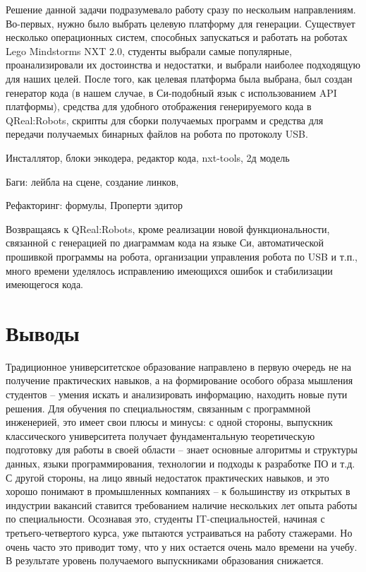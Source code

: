 \documentclass[a5paper]{article}
\begin{document}
Решение данной задачи подразумевало работу сразу по нескольим направлениям. Во-первых, нужно было выбрать целевую платформу для генерации. Существует несколько операционных систем, способных запускаться и работать на роботах Lego Mindstorms NXT 2.0, студенты выбрали самые популярные, проанализировали их достоинства и недостатки, и выбрали наиболее подходящую для наших целей.
После того, как целевая платформа была выбрана, был создан генератор кода (в нашем случае, в Си-подобный язык с использованием API платформы), средства для удобного отображения генерируемого кода в QReal:Robots, скрипты для сборки получаемых программ и средства для передачи получаемых бинарных файлов на робота по протоколу USB.


Инсталлятор, блоки энкодера, редактор кода, nxt-tools, 2д модель

Баги: лейбла на сцене, создание линков,

Рефакторинг: формулы, Проперти эдитор


Возвращаясь к QReal:Robots, кроме реализации новой функциональности, связанной с генерацией по диаграммам кода на языке Си, автоматической прошивкой программы на робота, организации управления робота по USB и т.п., много времени уделялось исправлению имеющихся ошибок и стабилизации имеющегося кода. 

\section{Выводы} 

Традиционное университетское образование направлено в первую очередь не на получение практических навыков, а на формирование особого образа мышления студентов -- умения искать и анализировать информацию, находить новые пути решения. Для обучения по специальностям, связанным с программной инженерией, это имеет свои плюсы и минусы: с одной стороны, выпускник классического университета получает фундаментальную теоретическую подготовку для работы в своей области -- знает основные алгоритмы и структуры данных, языки программирования, технологии и подходы к разработке ПО и т.д. С другой стороны, на лицо явный недостаток практических навыков, и это хорошо понимают в промышленных компаниях -- к большинству из открытых в индустрии вакансий ставится требованием наличие нескольких лет опыта работы по специальности. Осознавая это, студенты IT-специальностей, начиная с третьего-четвертого курса, уже пытаются устраиваться на работу стажерами. Но очень часто это приводит тому, что у них остается очень мало времени на учебу. В результате уровень получаемого выпускниками образования снижается.
\end{document}
